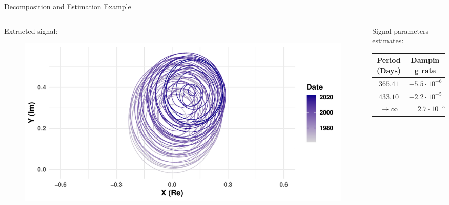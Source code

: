 \documentclass[pdf, unicode, ucs, notheorems]{beamer}
\newcommand{\bluetext}[1]{{\usebeamercolor[fg]{bluetext_color}#1}}
\theoremstyle{definition}
\begin{document}
\begin{frame}{Decomposition and Estimation Example}
  \begin{columns}
    \begin{column}{0.5\textwidth}
      Extracted signal:
      \begin{figure}[!ht]
        \center
        \includegraphics[width=\textwidth]{Earth_complex_signal.pdf}\\
      \end{figure}
    \end{column}
    \begin{column}{0.5\textwidth}
      Signal parameters estimates:
      \begin{table}
        \centering
        \begin{tabular}{c|c}
          Period (Days) & Damping rate \\ \hline
          $365.41$ & $-5.5 \cdot 10^{-6}$ \\ \hline
          $433.10$ & $-2.2 \cdot 10^{-5}$ \\ \hline
          $\to \infty$ & $\phantom{-}2.7 \cdot 10^{-5}$
        \end{tabular}
      \end{table}
      \vspace*{0.6cm}
    \end{column}
  \end{columns}
\end{frame}

\end{document}
